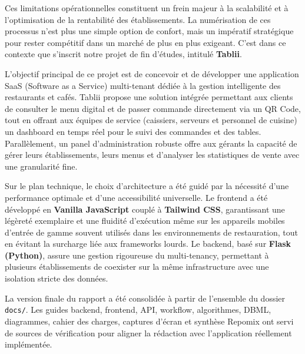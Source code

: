 \documentclass[12pt,a4paper]{report}
\newcommand{\resourcepath}[1]{\texttt{\footnotesize #1}}
\begin{document}
Ces limitations opérationnelles constituent un frein majeur à la scalabilité et à l'optimisation de la rentabilité des établissements. La numérisation de ces processus n'est plus une simple option de confort, mais un impératif stratégique pour rester compétitif dans un marché de plus en plus exigeant. C'est dans ce contexte que s'inscrit notre projet de fin d'études, intitulé \textbf{Tablii}.

L'objectif principal de ce projet est de concevoir et de développer une application SaaS (Software as a Service) multi-tenant dédiée à la gestion intelligente des restaurants et cafés. Tablii propose une solution intégrée permettant aux clients de consulter le menu digital et de passer commande directement via un QR Code, tout en offrant aux équipes de service (caissiers, serveurs et personnel de cuisine) un dashboard en temps réel pour le suivi des commandes et des tables. Parallèlement, un panel d'administration robuste offre aux gérants la capacité de gérer leurs établissements, leurs menus et d'analyser les statistiques de vente avec une granularité fine.

Sur le plan technique, le choix d'architecture a été guidé par la nécessité d'une performance optimale et d'une accessibilité universelle. Le frontend a été développé en \textbf{Vanilla JavaScript} couplé à \textbf{Tailwind CSS}, garantissant une légèreté exemplaire et une fluidité d'exécution même sur les appareils mobiles d'entrée de gamme souvent utilisés dans les environnements de restauration, tout en évitant la surcharge liée aux frameworks lourds. Le backend, basé sur \textbf{Flask (Python)}, assure une gestion rigoureuse du multi-tenancy, permettant à plusieurs établissements de coexister sur la même infrastructure avec une isolation stricte des données.

\begin{summarybox}
La version finale du rapport a \'et\'e consolid\'ee \`a partir de l'ensemble du dossier \resourcepath{docs/}. Les guides backend, frontend, API, workflow, algorithmes, DBML, diagrammes, cahier des charges, captures d'\'ecran et synth\`ese Repomix ont servi de sources de v\'erification pour aligner la r\'edaction avec l'application r\'eellement impl\'ement\'ee.
\end{summarybox}
\end{document}
